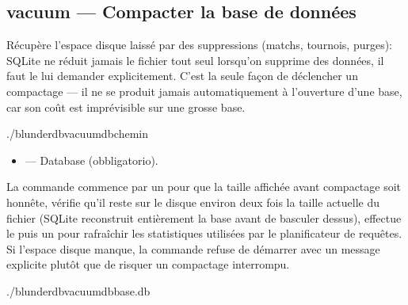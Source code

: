 \documentclass[letterpaper,10pt,italian]{sphinxmanual}
\begin{document}
\subsection{vacuum — Compacter la base de données}
\label{\detokenize{cli:vacuum-compacter-la-base-de-donnees}}
\sphinxAtStartPar
Récupère l’espace disque laissé par des suppressions (matchs, tournois,
purges): SQLite ne réduit jamais le fichier tout seul lorsqu’on supprime des
données, il faut le lui demander explicitement. C’est la seule façon de
déclencher un compactage — il ne se produit jamais automatiquement à
l’ouverture d’une base, car son coût est imprévisible sur une grosse base.

\begin{sphinxVerbatim}[commandchars=\\\{\}]
./blunderdbvacuum\PYGZhy{}\PYGZhy{}db\PYGZlt{}chemin\PYGZgt{}
\end{sphinxVerbatim}

\sphinxAtStartPar
{}
\begin{itemize}
\item {} 
\sphinxAtStartPar
{} — Database (obbligatorio).

\end{itemize}

\sphinxAtStartPar
La commande commence par un  pour que la taille
affichée avant compactage soit honnête, vérifie qu’il reste sur le disque
environ deux fois la taille actuelle du fichier (SQLite reconstruit
entièrement la base avant de basculer dessus), effectue le  puis un
 pour rafraîchir les statistiques utilisées par le planificateur de
requêtes. Si l’espace disque manque, la commande refuse de démarrer avec un
message explicite plutôt que de risquer un compactage interrompu.

\sphinxAtStartPar
{}

\begin{sphinxVerbatim}[commandchars=\\\{\}]
./blunderdbvacuum\PYGZhy{}\PYGZhy{}dbbase.db

\end{sphinxVerbatim}
\end{document}
